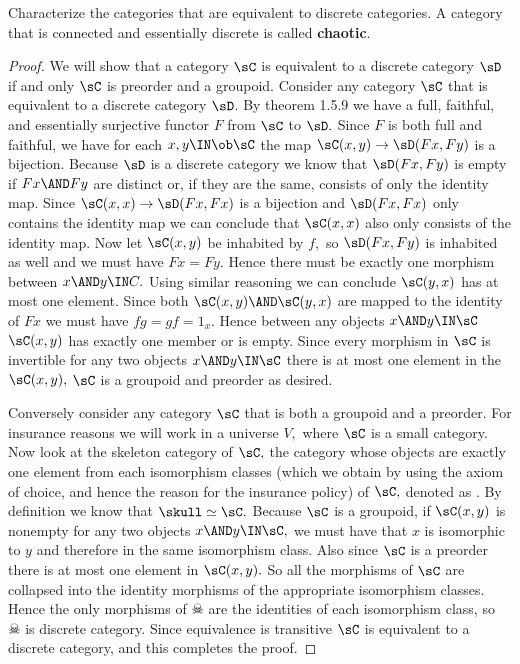 \documentclass[main.tex]{subfiles}
\begin{document}
\begin{exercise}
	Characterize the categories that are equivalent to
	discrete categories. A category that is connected and essentially
	discrete is called \textbf{chaotic}.
\end{exercise}
\begin{proof}
	We will show that a category $ \sC $ is equivalent to a discrete category $ \sD $ if and only $ \sC $ is preorder and a groupoid.
	Consider any category $ \sC $ that is equivalent to a discrete category
	$ \sD $. By theorem 1.5.9 we have a full, faithful, and essentially
	surjective functor $ F $ from $ \sC $ to $\sD. $ Since $ F $ is both
	full and
	faithful, we have for each $ x,y\IN\ob\sC $ the map $
	\sC(x,y)\to\sD(Fx,Fy) $ is a bijection. Because $ \sD $ is a discrete
	category we know that $ \sD(Fx,Fy) $ is empty if $ Fx\AND Fy $
	are distinct or, if they are the same, consists of only the identity
	map. Since $ \sC(x,x)\to \sD(Fx,Fx) $ is a bijection and $ \sD(Fx,Fx) $
	only contains the identity map we can conclude that $ \sC(x,x) $ also
	only consists of the identity map. Now let $\sC(x,y)$ be inhabited by $
	f, $ so $ \sD(Fx,Fy) $ is inhabited as well and we must have $ Fx=Fy.$
	Hence there must be exactly one morphism between $ x\AND y\IN C. $
	Using similar reasoning we can conclude $ \sC(y,x) $ has at most one
	element. Since both $ \sC(x,y) \AND \sC(y,x)$ are mapped to the
	identity of $ Fx $ we must have $fg=gf=1_x .$ Hence between any objects
	$ x\AND y\IN\sC $ $ \sC(x,y) $ has exactly one member or is empty. Since
	every morphism in $ \sC $ is invertible for any two objects $ x\AND
	y\IN\sC $ there is at most one element in the $ \sC(x,y),$ $ \sC $ is
	a groupoid and preorder as desired.

	Conversely consider any category $ \sC $ that is both a groupoid and a
	preorder. For insurance reasons we will work in a universe $ V, $
	where $ \sC $ is a small category.
	Now look at the skeleton category of $\sC, $ the category whose
	objects are exactly one element from each isomorphism classes (which we obtain by using the axiom of choice, and hence the reason for the insurance policy) of $ \sC,$ denoted
	as  \skull. By definition we know that $ \skull\simeq \sC.$ Because
	$ \sC $ is a groupoid, if $ \sC(x,y) $ is nonempty for any two objects
	$ x\AND y\IN\sC,$ we must have that $ x $ is isomorphic to $ y$ and
	therefore in the same isomorphism class. Also since $ \sC $ is a
	preorder there is at most one element in $ \sC(x,y).$ So all the
	morphisms of $ \sC $ are collapsed into the identity morphisms of the
	appropriate isomorphism classes. Hence the only morphisms of $ \skull $
	are the identities of each isomorphism class, so $ \skull $ is discrete
	category. Since equivalence is transitive $ \sC $ is equivalent to a
	discrete category, and this completes the proof.
\end{proof}
\end{document}
